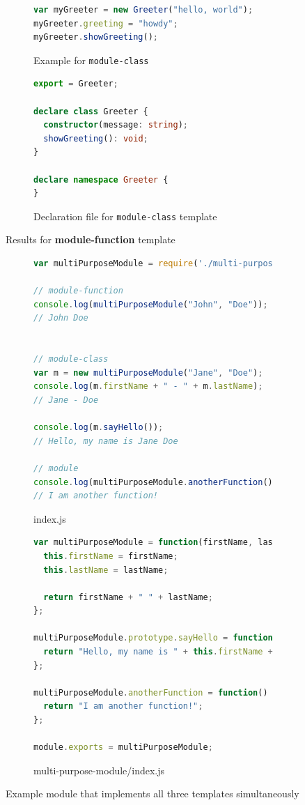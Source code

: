 \documentclass[english,cleveref,autoref,submission]{programming}
\begin{document}
\begin{figure}[tp]
\begin{subfigure}{0.48\linewidth}
\begin{lstlisting}[language=JavaScript]
var myGreeter = new Greeter("hello, world");
myGreeter.greeting = "howdy";
myGreeter.showGreeting();
      \end{lstlisting}
      \caption{Example for \texttt{module-class}}
    \end{subfigure}
    \hfill
    \begin{subfigure}{0.48\linewidth}
      \begin{lstlisting}[language=TypeScript]
export = Greeter;

declare class Greeter {
  constructor(message: string);
  showGreeting(): void;
}

declare namespace Greeter {
}
      \end{lstlisting}
      \caption{Declaration file for \texttt{module-class} template}
    \end{subfigure}

  \caption{Results for \textbf{module-function} template}
  \label{fig:typescript-templates-by-example}
\end{figure}

\begin{figure}[tp]
  \centering
  \begin{subfigure}{0.80\linewidth}
      \begin{lstlisting}[language=JavaScript]
var multiPurposeModule = require('./multi-purpose-module');

// module-function
console.log(multiPurposeModule("John", "Doe"));
// John Doe


// module-class
var m = new multiPurposeModule("Jane", "Doe");
console.log(m.firstName + " - " + m.lastName);
// Jane - Doe

console.log(m.sayHello());
// Hello, my name is Jane Doe

// module
console.log(multiPurposeModule.anotherFunction());
// I am another function! 
      \end{lstlisting}
      \caption{index.js}
    \end{subfigure}

    \begin{subfigure}{0.80\linewidth}
      \begin{lstlisting}[language=TypeScript]
var multiPurposeModule = function(firstName, lastName) {
  this.firstName = firstName;
  this.lastName = lastName;

  return firstName + " " + lastName;
};

multiPurposeModule.prototype.sayHello = function() {
  return "Hello, my name is " + this.firstName + " " + this.lastName;
};

multiPurposeModule.anotherFunction = function() {
  return "I am another function!";
};

module.exports = multiPurposeModule;   
      \end{lstlisting}
      \caption{multi-purpose-module/index.js}
    \end{subfigure}
  \caption{Example module that implements all three templates simultaneously}
  \label{fig:multi-purpose-module-example}
\end{figure}
\end{document}
